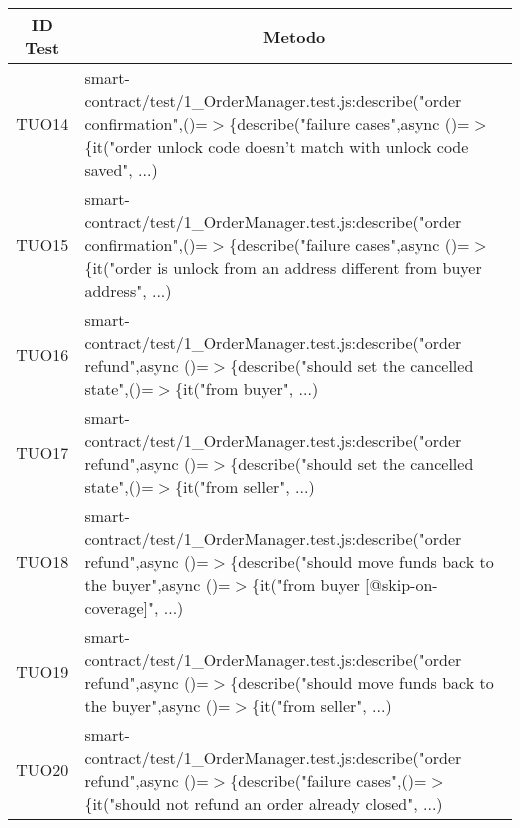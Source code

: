 \begin{table}[H]
  \centering
  \renewcommand{\arraystretch}{1.8}
  \begin{tabular}{c|p{15cm}}
    \rowcolor[HTML]{125E28}
    \color[HTML]{FFFFFF}\textbf{ID Test}
          & \multicolumn{1}{c}{\color[HTML]{FFFFFF}\textbf{Metodo}}                                                                                                                                                  \\
    \hline
    TUO14 & smart-contract/test/1\_OrderManager.test.js:describe("order confirmation",\newline()=$>$\{describe("failure cases",async ()=$>$\{it("order unlock code doesn't match with unlock code saved", ...)       \\
    TUO15 & smart-contract/test/1\_OrderManager.test.js:describe("order confirmation",\newline()=$>$\{describe("failure cases",async ()=$>$\{it("order is unlock from an address different from buyer address", ...) \\
    TUO16 & smart-contract/test/1\_OrderManager.test.js:describe("order refund",\newline async ()=$>$\{describe("should set the cancelled state",()=$>$\{it("from buyer", ...)                                       \\
    TUO17 & smart-contract/test/1\_OrderManager.test.js:describe("order refund",\newline async ()=$>$\{describe("should set the cancelled state",()=$>$\{it("from seller", ...)                                      \\
    TUO18 & smart-contract/test/1\_OrderManager.test.js:describe("order refund",\newline async ()=$>$\{describe("should move funds back to the buyer",async ()=$>$\{it("from buyer [@skip-on-coverage]", ...)        \\
    TUO19 & smart-contract/test/1\_OrderManager.test.js:describe("order refund",\newline async ()=$>$\{describe("should move funds back to the buyer",async ()=$>$\{it("from seller", ...)                           \\
    TUO20 & smart-contract/test/1\_OrderManager.test.js:describe("order refund",\newline async ()=$>$\{describe("failure cases",()=$>$\{it("should not refund an order already closed", ...)                         \\

\end{tabular}
\end{table}
